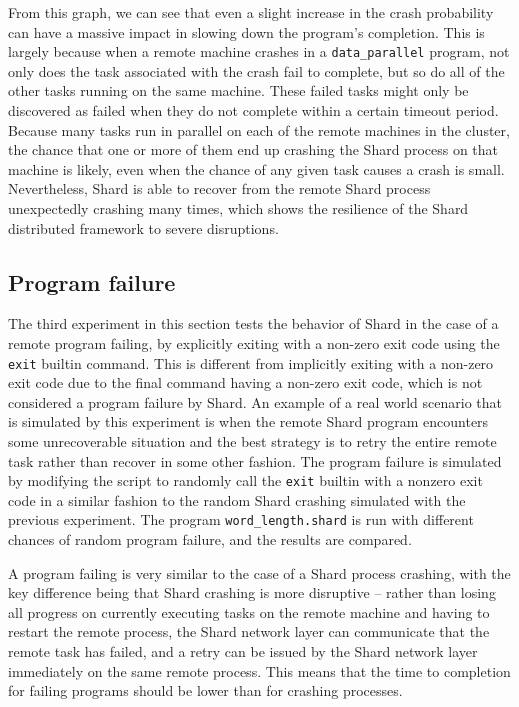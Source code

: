 \documentclass[oneside]{report}
\begin{document}
From this graph, we can see that even a slight increase in the crash probability can have a massive impact in slowing down the program's completion.
This is largely because when a remote machine crashes in a \texttt{data\_parallel} program, not only does the task associated with the crash fail to complete, but so do all of the other tasks running on the same machine.
These failed tasks might only be discovered as failed when they do not complete within a certain timeout period.
Because many tasks run in parallel on each of the remote machines in the cluster, the chance that one or more of them end up crashing the Shard process on that machine is likely, even when the chance of any given task causes a crash is small.
Nevertheless, Shard is able to recover from the remote Shard process unexpectedly crashing many times, which shows the resilience of the Shard distributed framework to severe disruptions.

\subsection{Program failure}
The third experiment in this section tests the behavior of Shard in the case of a remote program failing, by explicitly exiting with a non-zero exit code using the \texttt{exit} builtin command.
This is different from implicitly exiting with a non-zero exit code due to the final command having a non-zero exit code, which is not considered a program failure by Shard.
An example of a real world scenario that is simulated by this experiment is when the remote Shard program encounters some unrecoverable situation and the best strategy is to retry the entire remote task rather than recover in some other fashion.
The program failure is simulated by modifying the script to randomly call the \texttt{exit} builtin with a nonzero exit code in a similar fashion to the random Shard crashing simulated with the previous experiment.
The program \texttt{word\_length.shard} is run with different chances of random program failure, and the results are compared.

A program failing is very similar to the case of a Shard process crashing, with the key difference being that Shard crashing is more disruptive -- rather than losing all progress on currently executing tasks on the remote machine and having to restart the remote process, the Shard network layer can communicate that the remote task has failed, and a retry can be issued by the Shard network layer immediately on the same remote process.
This means that the time to completion for failing programs should be lower than for crashing processes.
\end{document}

